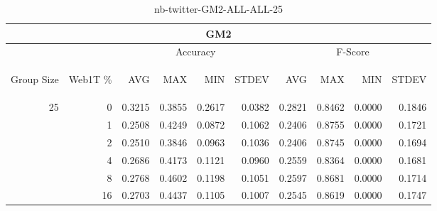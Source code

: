 \begin{center}
\begin{table}[htbp]
\begin{tabular}{ | r | r | r | r | r | r | r | r | r | r |}
\hline
\multicolumn{10}{|c|}{GM2}\\
\hline
 & & \multicolumn{4}{|c|}{Accuracy} & \multicolumn{4}{|c|}{F-Score}\\ \cline{3-10}
\begin{sideways}Group Size\end{sideways} & \begin{sideways}Web1T \%\end{sideways} & \begin{sideways}AVG\end{sideways} & \begin{sideways}MAX\end{sideways} & \begin{sideways}MIN\end{sideways} & \begin{sideways}STDEV\end{sideways} & \begin{sideways}AVG\end{sideways} & \begin{sideways}MAX\end{sideways} & \begin{sideways}MIN\end{sideways} & \begin{sideways}STDEV\end{sideways}\\
\hline
\multirow{5}{*}{25}
 & 0 & 0.3215 & 0.3855 & 0.2617 & 0.0382 & 0.2821 & 0.8462 & 0.0000 & 0.1846\\ \cline{2-10}
 & 1 & 0.2508 & 0.4249 & 0.0872 & 0.1062 & 0.2406 & 0.8755 & 0.0000 & 0.1721\\ \cline{2-10}
 & 2 & 0.2510 & 0.3846 & 0.0963 & 0.1036 & 0.2406 & 0.8745 & 0.0000 & 0.1694\\ \cline{2-10}
 & 4 & 0.2686 & 0.4173 & 0.1121 & 0.0960 & 0.2559 & 0.8364 & 0.0000 & 0.1681\\ \cline{2-10}
 & 8 & 0.2768 & 0.4602 & 0.1198 & 0.1051 & 0.2597 & 0.8681 & 0.0000 & 0.1714\\ \cline{2-10}
 & 16 & 0.2703 & 0.4437 & 0.1105 & 0.1007 & 0.2545 & 0.8619 & 0.0000 & 0.1747\\ \cline{2-10}
\hline
\end{tabular}
\caption{nb-twitter-GM2-ALL-ALL-25}
\label{table:nb-twitter-GM2-ALL-ALL-25}
\end{table}
\end{center}

